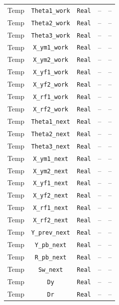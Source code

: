 \begin{center}
\begin{longtable}{c c c c c}
    Temp & \texttt{Theta1\_work} & \texttt{Real} & -- & -- \\ %
    Temp & \texttt{Theta2\_work} & \texttt{Real} & -- & -- \\ %
    Temp & \texttt{Theta3\_work} & \texttt{Real} & -- & -- \\ %
    Temp & \texttt{X\_ym1\_work} & \texttt{Real} & -- & -- \\ %
    Temp & \texttt{X\_ym2\_work} & \texttt{Real} & -- & -- \\ %
    Temp & \texttt{X\_yf1\_work} & \texttt{Real} & -- & -- \\ %
    Temp & \texttt{X\_yf2\_work} & \texttt{Real} & -- & -- \\ %
    Temp & \texttt{X\_rf1\_work} & \texttt{Real} & -- & -- \\ %
    Temp & \texttt{X\_rf2\_work} & \texttt{Real} & -- & -- \\ %
    Temp & \texttt{Theta1\_next} & \texttt{Real} & -- & -- \\ %
    Temp & \texttt{Theta2\_next} & \texttt{Real} & -- & -- \\ %
    Temp & \texttt{Theta3\_next} & \texttt{Real} & -- & -- \\ %
    Temp & \texttt{X\_ym1\_next} & \texttt{Real} & -- & -- \\ %
    Temp & \texttt{X\_ym2\_next} & \texttt{Real} & -- & -- \\ %
    Temp & \texttt{X\_yf1\_next} & \texttt{Real} & -- & -- \\ %
    Temp & \texttt{X\_yf2\_next} & \texttt{Real} & -- & -- \\ %
    Temp & \texttt{X\_rf1\_next} & \texttt{Real} & -- & -- \\ %
    Temp & \texttt{X\_rf2\_next} & \texttt{Real} & -- & -- \\ %
    Temp & \texttt{Y\_prev\_next} & \texttt{Real} & -- & -- \\ %
    Temp & \texttt{Y\_pb\_next} & \texttt{Real} & -- & -- \\ %
    Temp & \texttt{R\_pb\_next} & \texttt{Real} & -- & -- \\ %
    Temp & \texttt{Sw\_next} & \texttt{Real} & -- & -- \\ %
    Temp & \texttt{Dy} & \texttt{Real} & -- & -- \\ %
    Temp & \texttt{Dr} & \texttt{Real} & -- & -- \\ %

\end{longtable}
\end{center}
